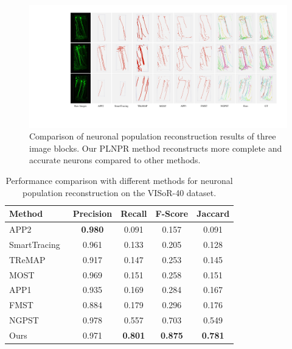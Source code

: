 \begin{figure}[t]
	\centering
	\includegraphics[width=1\textwidth]{./Illustrations/iteration3.pdf}
	\caption{Comparison of neuronal population reconstruction results of three image blocks. %
Our PLNPR method reconstructs more complete and accurate neurons compared to other methods. 
	}
	\label{fig:compare_VISoR}
\end{figure}



\begin{table}[th]
	\centering
	\caption{Performance comparison with different methods for neuronal population reconstruction on the VISoR-40 dataset.}
	\label{table:compare_VISoR}
	\begin{tabular}{lcccc}
		\toprule
		Method & Precision & Recall & F-Score & Jaccard\\
		\midrule
		APP2~\cite{Xiao2013}
		& \textbf{0.980} & 0.091 & 0.157 & 0.091\\
		SmartTracing~\cite{Chen2015}
		& 0.961 & 0.133 & 0.205 & 0.128\\
		TReMAP~\cite{Zhou2016}
		& 0.917 & 0.147 & 0.253 & 0.145\\
		MOST~\cite{Wu2014}          
		& 0.969 & 0.151& 0.258& 0.151\\
		APP1~\cite{Peng2011}
		& 0.935 & 0.169 & 0.284 & 0.167\\
		FMST~\cite{Yang2019}
		& 0.884 & 0.179 & 0.296 &  0.176\\
		NGPST~\cite{Quan2015}
		& 0.978 & 0.557& 0.703 & 0.549\\
		\midrule
		Ours
		& 0.971 & \textbf{0.801}&\textbf{0.875} & \textbf{0.781}\\
		\bottomrule
	\end{tabular}
\end{table}

